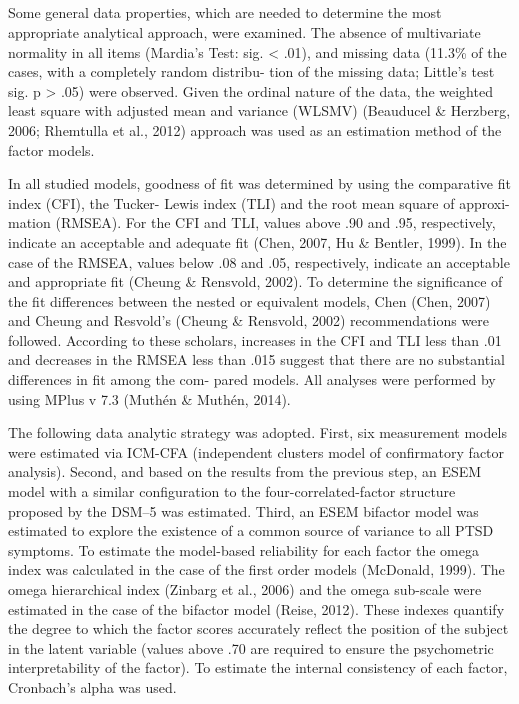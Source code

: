 \clearpage
\makeatletter
\efloat@restorefloats
\makeatother


\begin{appendix}
\section{}
Some general data properties, which are needed to determine the most
appropriate analytical approach, were examined. The absence of
multivariate normality in all items (Mardia's Test: sig. \textless{}
.01), and missing data (11.3\% of the cases, with a completely random
distribu- tion of the missing data; Little's test sig. p \textgreater{}
.05) were observed. Given the ordinal nature of the data, the weighted
least square with adjusted mean and variance (WLSMV) (Beauducel \&
Herzberg, 2006; Rhemtulla et al., 2012) approach was used as an
estimation method of the factor models.

In all studied models, goodness of fit was determined by using the
comparative fit index (CFI), the Tucker- Lewis index (TLI) and the root
mean square of approxi- mation (RMSEA). For the CFI and TLI, values
above .90 and .95, respectively, indicate an acceptable and adequate fit
(Chen, 2007, Hu \& Bentler, 1999). In the case of the RMSEA, values
below .08 and .05, respectively, indicate an acceptable and appropriate
fit (Cheung \& Rensvold, 2002). To determine the significance of the fit
differences between the nested or equivalent models, Chen (Chen, 2007)
and Cheung and Resvold's (Cheung \& Rensvold, 2002) recommendations were
followed. According to these scholars, increases in the CFI and TLI less
than .01 and decreases in the RMSEA less than .015 suggest that there
are no substantial differences in fit among the com- pared models. All
analyses were performed by using MPlus v 7.3 (Muthén \& Muthén, 2014).

The following data analytic strategy was adopted. First, six measurement
models were estimated via ICM-CFA (independent clusters model of
confirmatory factor analysis). Second, and based on the results from the
previous step, an ESEM model with a similar configuration to the
four-correlated-factor structure proposed by the DSM--5 was estimated.
Third, an ESEM bifactor model was estimated to explore the existence of
a common source of variance to all PTSD symptoms. To estimate the
model-based reliability for each factor the omega index was calculated
in the case of the first order models (McDonald, 1999). The omega
hierarchical index (Zinbarg et al., 2006) and the omega sub-scale were
estimated in the case of the bifactor model (Reise, 2012). These indexes
quantify the degree to which the factor scores accurately reflect the
position of the subject in the latent variable (values above .70 are
required to ensure the psychometric interpretability of the factor). To
estimate the internal consistency of each factor, Cronbach's alpha was
used.


\end{appendix}
